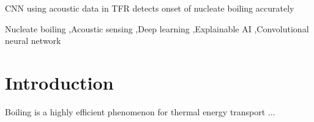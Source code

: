 \documentclass[final,3p,times,twocolumn, dvipdfmx]{elsarticle}
\begin{document}
\begin{frontmatter}
\begin{highlights}
\item CNN using acoustic data in TFR detects onset of nucleate boiling accurately
\end{highlights}

\begin{keyword}


Nucleate boiling \sep Acoustic sensing \sep Deep learning \sep Explainable AI \sep Convolutional neural network
\end{keyword}

\end{frontmatter}



\section{Introduction}
\label{sec1}

Boiling is a highly efficient phenomenon for thermal energy transport ...




 


\end{document}
